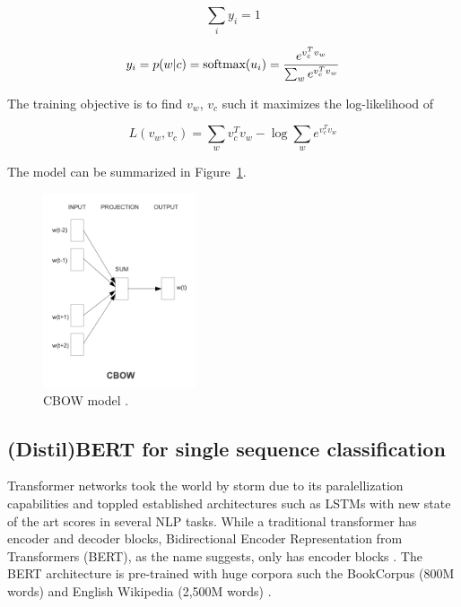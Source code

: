 \begin{equation}
	\label{eqn:w2prob}
	\sum_i y_i = 1
\end{equation}

\begin{equation}
	\label{probs}
	y_i = p(w|c) = \textnormal{softmax}(u_i) = \frac{e^{v^T _cv_w}}{\sum_w e^{v^T _cv_w}}
\end{equation}

The training objective is to find $v_w$, $v_c$ such it maximizes the log-likelihood of

\begin{equation}
	\label{llik}
	L(v_w, v_c) = \sum_w v_c^T v_w - \log \sum_w e^{v_c^T v_w}
\end{equation}

The model can be summarized in Figure~\ref{cbow}.

\begin{figure}[h]
	\centering
	\includegraphics[width=0.4\textwidth]{../img/cbow.png}
	\caption{CBOW model \citep{mikolov2013efficient}.}
	\label{cbow}
\end{figure}
 \newpage
\subsection{(Distil)BERT for single sequence classification}

Transformer networks took the world by storm due to its paralellization capabilities and toppled established architectures such as LSTMs with new state of the art scores in several NLP tasks. While a traditional transformer has encoder and decoder blocks, Bidirectional Encoder Representation from Transformers (BERT), as the name suggests, only has encoder blocks \citep{halthor2020}. The BERT architecture is pre-trained with huge corpora such the BookCorpus (800M words) and English Wikipedia (2,500M words) \citep{devlin2019bert}.

